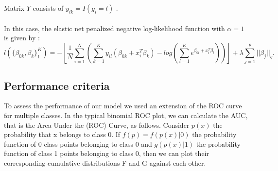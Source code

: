     Matrix $Y$ consists of $y_{ik}=I(g_i=l)$ \parencite{Friedman_2010}. 
    \\\\
    In this case, the elastic net penalized negative log-likelihood 
    function with $\alpha=1$ is given by 
    \parencite{hastie2016introduction}:
    \begin{equation}
        l(\{\beta_{0k},\beta_k\}_1^K)=
        -\left[ 
            \frac{1}{N} \sum_{i=1}^N\left( 
                \sum_{k=1}^Ky_{il}(\beta_{0k}+x_i^T\beta_k)-
                log\left(
                    \sum_{l=1}^K e^{\beta_{0l}+x_i^T\beta_l}
                \right)
            \right)
        \right] + \lambda \sum_{j=1}^p ||\beta_j||_q.  
    \end{equation}


\subsection{Performance criteria}
    To assess the performance of our model we used an extension of 
    the ROC curve for multiple classes. In the typical binomial ROC 
    plot, we can calculate the AUC, that is the Area Under the (ROC) 
    Curve, as follows. Consider $p(x)$ the probability that x belongs 
    to class 0. If $f(p)=f(p(x)|0)$ the probability function of 0 
    class points belonging to class 0 and $g(p(x)|1)$ the probability 
    function of class 1 points belonging to class 0, then we can plot 
    their corresponding cumulative distributions F and G against each 
    other.
    
